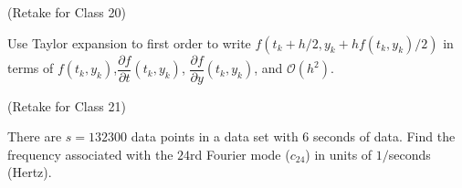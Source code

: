 \documentclass[12pt,letterpaper,noanswers]{exam}
\begin{document}
\begin{questions}
\vspace{2cm}

\item (Retake for Class 20)

Use Taylor expansion to first order to write $f(t_k+h/2,y_k+hf(t_k,y_k)/2)$ in terms of $f(t_k, y_k)$,$\dfrac{\partial f}{\partial t}(t_k,y_k)$, $\dfrac{\partial f}{\partial y}(t_k,y_k)$, and $\mathcal{O}(h^2)$.

\vspace{3cm}

\item (Retake for Class 21)

There are $s = 132300$ data points in a data set with $6$ seconds of data.  Find the frequency associated with the $24$rd Fourier mode ($c_{24}$) in units of $1/$seconds (Hertz).

\end{questions}
\end{document}
